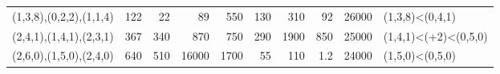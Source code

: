 \begin{tabular}{lrrrrrrrrl}
 (1,3,8),(0,2,2),(1,1,4) &      122   &                                22 &                              89 &                               550 &                             130 &                               310 &                           92    &      26000 & (1,3,8)<(0,4,1)         \\
 (2,4,1),(1,4,1),(2,3,1) &      367   &                               340 &                             870 &                               750 &                             290 &                              1900 &                          850    &      25000 & (1,4,1)<(+2)<(0,5,0)    \\
 (2,6,0),(1,5,0),(2,4,0) &      640   &                               510 &                           16000 &                              1700 &                              55 &                               110 &                            1.2  &      24000 & (1,5,0)<(0,5,0)         \\
\hline
\end{tabular}